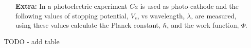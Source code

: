 \documentclass[colorlinks,11pt,a4paper,normalphoto,withhyper,ragged2e]{altareport}
\begin{document}
\begin{enumerate}[leftmargin=1cm]
		
		 \item[\textbf{Extra:}] In a photoelectric experiment $Ca$ is used as photo-cathode and the following values of stopping potential, $V_s$, vs wavelength, $\lambda$, are measured, using these values calculate the Planck constant, $\hbar$, and the work function, $\Phi$.\\
		 
	\end{enumerate}
	
	TODO - add table 



	\pagebreak
	
	
	
%
%
\end{document}
